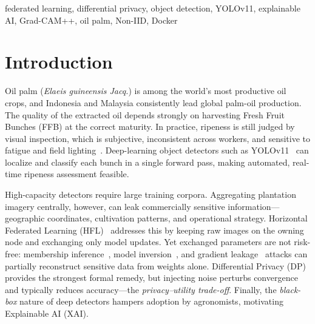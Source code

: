 \documentclass[conference]{IEEEtran}
\begin{document}
\begin{IEEEkeywords}
federated learning, differential privacy, object detection, YOLOv11,
explainable AI, Grad-CAM++, oil palm, Non-IID, Docker
\end{IEEEkeywords}

\section{Introduction}
Oil palm (\emph{Elaeis guineensis Jacq.}) is among the world's most productive
oil crops, and Indonesia and Malaysia consistently lead global palm-oil
production. The quality of the extracted oil depends strongly on harvesting
Fresh Fruit Bunches (FFB) at the correct maturity. In practice, ripeness is
still judged by visual inspection, which is subjective, inconsistent across
workers, and sensitive to fatigue and field lighting~\cite{septiarini2020classification}.
Deep-learning object detectors such as YOLOv11~\cite{khanam2024yolov11} can
localize and classify each bunch in a single forward pass, making automated,
real-time ripeness assessment feasible.

High-capacity detectors require large training corpora. Aggregating plantation
imagery centrally, however, can leak commercially sensitive
information---geographic coordinates, cultivation patterns, and operational
strategy. Horizontal Federated Learning
(HFL)~\cite{mcmahan2017communication,yang2019federated} addresses this by
keeping raw images on the owning node and exchanging only model updates. Yet
exchanged parameters are not risk-free: membership inference~\cite{shokri2017membership},
model inversion~\cite{fredrikson2015model}, and gradient leakage~\cite{zhu2019deep}
attacks can partially reconstruct sensitive data from weights alone.
Differential Privacy (DP)~\cite{abadi2016deep} provides the strongest formal
remedy, but injecting noise perturbs convergence and typically reduces
accuracy---the \emph{privacy--utility trade-off}. Finally, the
\emph{black-box} nature of deep detectors hampers adoption by agronomists,
motivating Explainable AI (XAI).
\end{document}
